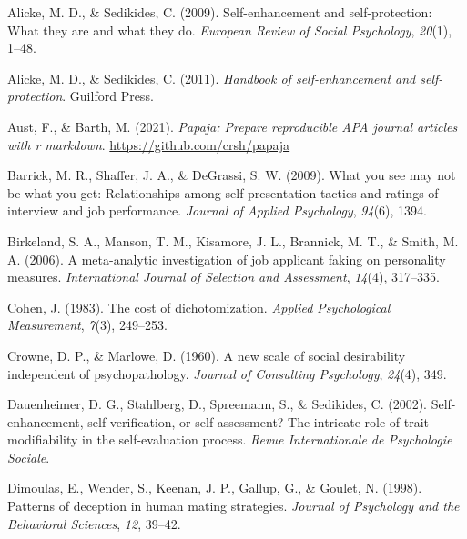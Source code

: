 \documentclass[
  ,man]{apa6}
\newlength{\cslhangindent}
\newlength{\cslentryspacingunit} %
\newenvironment{CSLReferences}[2] %
 {%
  \setlength{\parindent}{0pt}
  \ifodd #1
  \let\oldpar\par
  \def\par{\hangindent=\cslhangindent\oldpar}
  \fi
  \setlength{\parskip}{#2\cslentryspacingunit}
 }%
 {}
\begin{document}
\begingroup
\setlength{\parindent}{-0.5in}
\setlength{\leftskip}{0.5in}

\hypertarget{refs}{}
\begin{CSLReferences}{1}{0}
\leavevmode{}%
Alicke, M. D., \& Sedikides, C. (2009). Self-enhancement and self-protection: What they are and what they do. \emph{European Review of Social Psychology}, \emph{20}(1), 1--48.

\leavevmode{}%
Alicke, M. D., \& Sedikides, C. (2011). \emph{Handbook of self-enhancement and self-protection}. Guilford Press.

\leavevmode{}%
Aust, F., \& Barth, M. (2021). \emph{Papaja: Prepare reproducible APA journal articles with r markdown}. \url{https://github.com/crsh/papaja}

\leavevmode{}%
Barrick, M. R., Shaffer, J. A., \& DeGrassi, S. W. (2009). What you see may not be what you get: Relationships among self-presentation tactics and ratings of interview and job performance. \emph{Journal of Applied Psychology}, \emph{94}(6), 1394.

\leavevmode{}%
Birkeland, S. A., Manson, T. M., Kisamore, J. L., Brannick, M. T., \& Smith, M. A. (2006). A meta-analytic investigation of job applicant faking on personality measures. \emph{International Journal of Selection and Assessment}, \emph{14}(4), 317--335.

\leavevmode{}%
Cohen, J. (1983). The cost of dichotomization. \emph{Applied Psychological Measurement}, \emph{7}(3), 249--253.

\leavevmode{}%
Crowne, D. P., \& Marlowe, D. (1960). A new scale of social desirability independent of psychopathology. \emph{Journal of Consulting Psychology}, \emph{24}(4), 349.

\leavevmode{}%
Dauenheimer, D. G., Stahlberg, D., Spreemann, S., \& Sedikides, C. (2002). Self-enhancement, self-verification, or self-assessment? The intricate role of trait modifiability in the self-evaluation process. \emph{Revue Internationale de Psychologie Sociale}.

\leavevmode{}%
Dimoulas, E., Wender, S., Keenan, J. P., Gallup, G., \& Goulet, N. (1998). Patterns of deception in human mating strategies. \emph{Journal of Psychology and the Behavioral Sciences}, \emph{12}, 39--42.


\end{CSLReferences}
\end{document}
